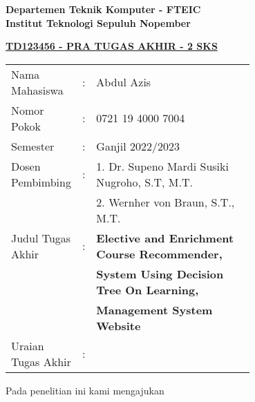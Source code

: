 \begin{flushleft}
  \textbf{Departemen Teknik Komputer - FTEIC}\\
  \textbf{Institut Teknologi Sepuluh Nopember}\\
\end{flushleft}

\begin{center}
  \underline{\textbf{TD123456 - PRA TUGAS AKHIR - 2 SKS}}
\end{center}

\begin{adjustwidth}{-0.2cm}{}
  \begin{tabular}{lcp{0.7\linewidth}}

    Nama Mahasiswa     & : & Abdul Azis                                            \\
    Nomor Pokok        & : & 0721 19 4000 7004                                     \\

    Semester           & : & Ganjil 2022/2023                                      \\

    Dosen Pembimbing   & : & 1. Dr. Supeno Mardi Susiki Nugroho, S.T, M.T.         \\
                       &   & 2. Wernher von Braun, S.T., M.T.                      \\
    Judul Tugas Akhir  & : & \textbf{Elective and Enrichment Course Recommender, } \\
                       &   & \textbf{System Using Decision Tree On Learning,}      \\
                       &   & \textbf{Management System Website}                    \\

    Uraian Tugas Akhir & : &                                                       \\
  \end{tabular}
\end{adjustwidth}

Pada penelitian ini kami mengajukan \lipsum[1][1-10]
\vspace{1ex}

